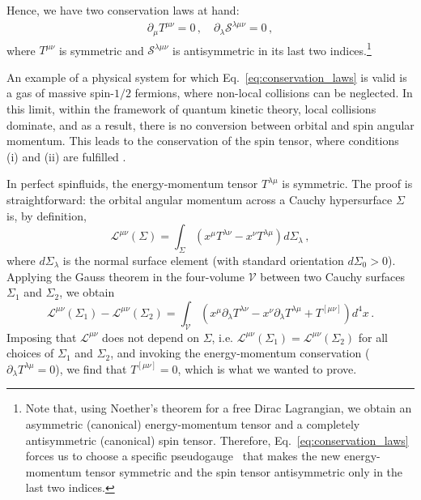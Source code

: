 \documentclass[12pt,aps,prd,nofootinbib,noshowkeys,noshowpacs,longbibliography,
superscriptaddress,tightenlines,floatfix,preprintnumbers]{revtex4-2}
\begin{document}
Hence, we have two conservation laws at hand:
\begin{eqnarray}
    \partial_\mu T^{\mu\nu} = 0\,, \quad \partial_\lambda \mathcal{S}^{\lambda\mu\nu} = 0\,,
    \label{eq:conservation_laws}
\end{eqnarray}
where $T^{\mu\nu}$ is symmetric and $\mathcal{S}^{\lambda\mu\nu}$ is antisymmetric in its last two indices.\footnote{Note that, using Noether's theorem for a free Dirac Lagrangian, we obtain an asymmetric (canonical) energy-momentum tensor and a completely antisymmetric  (canonical) spin tensor. Therefore, Eq.~\eqref{eq:conservation_laws} forces us to choose a specific pseudogauge~\cite{Hehl:1976vr,Speranza:2020ilk,Singh:2024qvg} that makes the new energy-momentum tensor symmetric and the spin tensor antisymmetric only in the last two indices.}

An example of a physical system for which Eq.~\eqref{eq:conservation_laws} is valid is a gas of massive spin-$1/2$ fermions, where non-local collisions can be neglected. In this limit, within the framework of quantum kinetic theory, local collisions dominate, and as a result, there is no conversion between orbital and spin angular momentum. This leads to the conservation of the spin tensor, where conditions (i) and (ii) are fulfilled \cite{Florkowski:2018fap,Weickgenannt:2020aaf,Speranza:2020ilk,Das:2022azr}. 


In perfect spinfluids, the energy-momentum tensor $T^{\lambda \mu}$ is symmetric. The proof is straightforward: the orbital angular momentum across a Cauchy hypersurface $\Sigma$ is, by definition,
\begin{equation}
    \mathcal{L}^{\mu \nu}(\Sigma)= \int_\Sigma \left(x^\mu T^{\lambda \nu}-x^\nu T^{\lambda \mu}\right) d\Sigma_\lambda \, ,
\end{equation}
where $d\Sigma_\lambda$ is the normal surface element (with standard orientation $d\Sigma_0>0$). Applying the Gauss theorem in the four-volume $\mathcal{V}$ between two Cauchy surfaces $\Sigma_1$ and $\Sigma_2$, we obtain~\cite{MTW_book}
\begin{equation}
    \mathcal{L}^{\mu \nu}(\Sigma_1)-\mathcal{L}^{\mu \nu}(\Sigma_2) = \int_{\mathcal{V}} \left(x^\mu \partial_\lambda T^{\lambda \nu}-x^\nu \partial_\lambda T^{\lambda \mu}+ T^{[\mu \nu]}\right) d^4 x \, .
\end{equation}
Imposing that $\mathcal{L}^{\mu \nu}$ does not depend on $\Sigma$, i.e. $\mathcal{L}^{\mu \nu}(\Sigma_1)=\mathcal{L}^{\mu \nu}(\Sigma_2)$ for all choices of $\Sigma_1$ and $\Sigma_2$, and invoking the energy-momentum conservation ($\partial_\lambda T^{\lambda \mu}=0$), we find that $T^{[\mu \nu]}=0$, which is what we wanted to prove.
%
%
\end{document}
